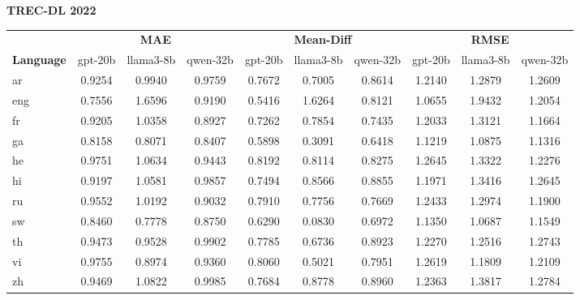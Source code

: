 \begin{table}[t]
\textbf{TREC-DL 2022} \\
\vspace{0.2em}
\begin{tabular}{lccccccccc}
\toprule
 & \multicolumn{3}{c}{\textbf{MAE}} & \multicolumn{3}{c}{\textbf{Mean-Diff}} & \multicolumn{3}{c}{\textbf{RMSE}} \\
\cmidrule(lr){2-4} \cmidrule(lr){5-7} \cmidrule(lr){8-10}
\textbf{Language} & gpt-20b & llama3-8b & qwen-32b & gpt-20b & llama3-8b & qwen-32b & gpt-20b & llama3-8b & qwen-32b \\
\midrule
ar & 0.9254 & 0.9940 & 0.9759 & 0.7672 & 0.7005 & 0.8614 & 1.2140 & 1.2879 & 1.2609 \\
eng & 0.7556 & 1.6596 & 0.9190 & 0.5416 & 1.6264 & 0.8121 & 1.0655 & 1.9432 & 1.2054 \\
fr & 0.9205 & 1.0358 & 0.8927 & 0.7262 & 0.7854 & 0.7435 & 1.2033 & 1.3121 & 1.1664 \\
ga & 0.8158 & 0.8071 & 0.8407 & 0.5898 & 0.3091 & 0.6418 & 1.1219 & 1.0875 & 1.1316 \\
he & 0.9751 & 1.0634 & 0.9443 & 0.8192 & 0.8114 & 0.8275 & 1.2645 & 1.3322 & 1.2276 \\
hi & 0.9197 & 1.0581 & 0.9857 & 0.7494 & 0.8566 & 0.8855 & 1.1971 & 1.3416 & 1.2645 \\
ru & 0.9552 & 1.0192 & 0.9032 & 0.7910 & 0.7756 & 0.7669 & 1.2433 & 1.2974 & 1.1900 \\
sw & 0.8460 & 0.7778 & 0.8750 & 0.6290 & 0.0830 & 0.6972 & 1.1350 & 1.0687 & 1.1549 \\
th & 0.9473 & 0.9528 & 0.9902 & 0.7785 & 0.6736 & 0.8923 & 1.2270 & 1.2516 & 1.2743 \\
vi & 0.9755 & 0.8974 & 0.9360 & 0.8060 & 0.5021 & 0.7951 & 1.2619 & 1.1809 & 1.2109 \\
zh & 0.9469 & 1.0822 & 0.9985 & 0.7684 & 0.8778 & 0.8960 & 1.2363 & 1.3817 & 1.2784 \\
\bottomrule
\end{tabular}
\end{table}